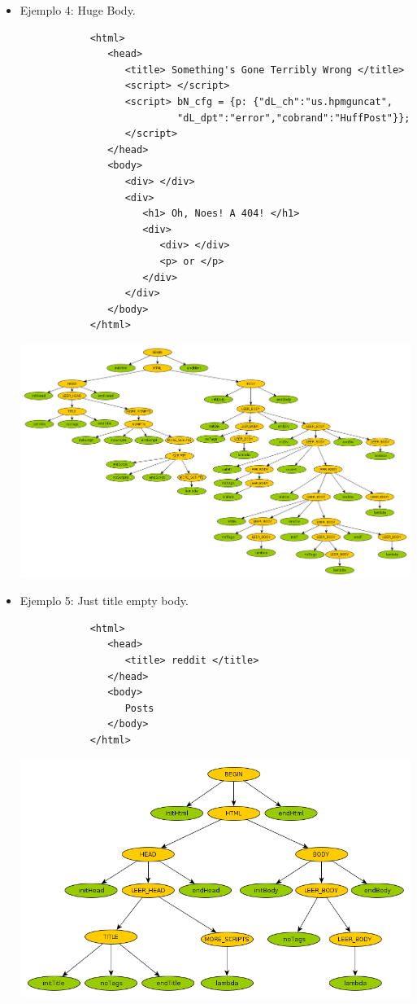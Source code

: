 \begin{itemize}
\newpage

	\item{  Ejemplo 4: Huge Body.
		\begin{verbatim}
			<html>
			   <head>
			      <title> Something's Gone Terribly Wrong </title>
			      <script> </script>
			      <script> bN_cfg = {p: {"dL_ch":"us.hpmguncat",
			               "dL_dpt":"error","cobrand":"HuffPost"}};
			      </script>
			   </head>
			   <body>
			      <div> </div>
			      <div>
			         <h1> Oh, Noes! A 404! </h1>
			         <div> 
			            <div> </div> 
			            <p> or </p> 
			         </div> 
			      </div>
			   </body> 
			</html>
		\end{verbatim}

	}

\begin{center}
	\includegraphics[scale=0.30]{Imagenes/4_huge_body.png}\\
\end{center}

\newpage

	\item{  Ejemplo 5: Just title empty body.
		\begin{verbatim}
			<html> 
			   <head>
			      <title> reddit </title> 
			   </head>
			   <body> 
			      Posts 
			   </body>
			</html>
		\end{verbatim}

	}

\begin{center}
	\includegraphics[scale=0.5]{Imagenes/5_just_title_empty_body.png}\\
\end{center}


\end{itemize}
